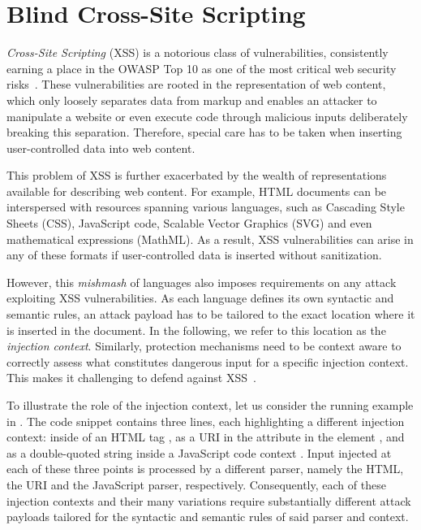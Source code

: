 \section{Blind Cross-Site Scripting}\label{sec:setting}

\emph{Cross-Site Scripting} (XSS) is a notorious class of vulnerabilities, consistently earning a place in the OWASP Top 10 as one of the most critical web security risks~\cite{OWASPTop10-2013, OWASPTop10-2017, OWASPTop10-2021}.
These vulnerabilities are rooted in the representation of web content, which only loosely separates data from markup and enables an attacker to manipulate a website or even execute code through malicious inputs deliberately breaking this separation. Therefore, special care has to be taken when inserting user-controlled data into web content.

This problem of XSS is further exacerbated by the wealth of representations available for describing web content. For example, HTML documents can be interspersed with resources spanning various languages, such as Cascading Style Sheets (CSS), JavaScript code, Scalable Vector Graphics (SVG) and even mathematical expressions (MathML). As a result, XSS vulnerabilities can arise in any of these formats if user-controlled data is inserted without sanitization.

However, this \emph{mishmash} of languages also imposes requirements on any attack exploiting XSS vulnerabilities. As each language defines its own syntactic and semantic rules, an attack payload has to be tailored to the exact location where it is inserted in the document. In the following, we refer to this location as the \emph{injection context}.
Similarly, protection mechanisms need to be context aware to correctly assess what constitutes dangerous input for a specific injection context.
This makes it challenging to defend against XSS~\cite{WeinSaxAkh2011,SaxMolLiv2011}.

To illustrate the role of the injection context, let us consider the running example in . 
The code snippet contains three lines, each highlighting a different injection context: inside of an HTML  tag , as a URI in the  attribute in the  element , and as a double-quoted string inside a JavaScript code context .
Input injected at each of these three points is processed by a different parser, namely the HTML, the URI and the JavaScript parser, respectively.
Consequently, each of these injection contexts and their many variations require substantially different attack payloads tailored for the syntactic and semantic rules of said parser and context.


